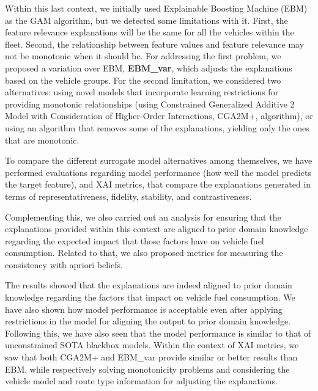 Within this last context, we initially used Explainable Boosting Machine (EBM) as the GAM algorithm, but we detected some limitations with it. First, the feature relevance explanations will be the same for all the vehicles within the fleet. Second, the relationship between feature values and feature relevance may not be monotonic when it should be. For addressing the first problem, we proposed a variation over EBM, \textbf{EBM\_var}, which adjusts the explanations based on the vehicle groups. For the second limitation, we considered two alternatives: using novel models that incorporate learning restrictions for providing monotonic relationships (using Constrained Generalized Additive 2 Model with Consideration of Higher-Order Interactions, CGA2M+, algorithm), or using an algorithm that removes some of the explanations, yielding only the ones that are monotonic. 

To compare the different surrogate model alternatives among themselves, we have performed evaluations regarding model performance (how well the model predicts the target feature), and XAI metrics, that compare the explanations generated in terms of representativeness, fidelity, stability, and contrastiveness.

Complementing this, we also carried out an analysis for ensuring that the explanations provided within this context are aligned to prior domain knowledge regarding the expected impact that those factors have on vehicle fuel consumption. Related to that, we also proposed metrics for measuring the consistency with apriori beliefs.

The results showed that the explanations are indeed aligned to prior domain knowledge regarding the factors that impact on vehicle fuel consumption. We have also shown how model performance is acceptable even after applying restrictions in the model for aligning the output to prior domain knowledge. Following this, we have also seen that the model performance is similar to that of unconstrained SOTA blackbox models. Within the context of XAI metrics, we saw that both CGA2M+ and EBM\_var provide similar or better results than EBM, while respectively solving monotonicity problems and considering the vehicle model and route type information for adjusting the explanations.

